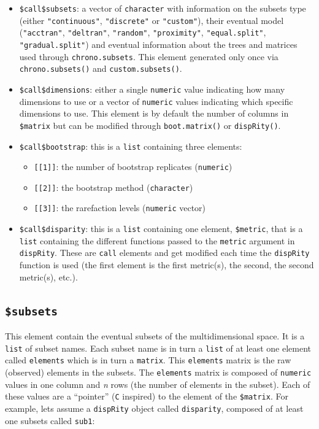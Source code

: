 \documentclass[]{book}
\providecommand{\tightlist}{%
  \setlength{\itemsep}{0pt}\setlength{\parskip}{0pt}}
\begin{document}
\begin{itemize}
\tightlist
\item
  \texttt{\$call\$subsets}: a vector of \texttt{character} with information on the subsets type (either \texttt{"continuous"}, \texttt{"discrete"} or \texttt{"custom"}), their eventual model (\texttt{"acctran"}, \texttt{"deltran"}, \texttt{"random"}, \texttt{"proximity"}, \texttt{"equal.split"}, \texttt{"gradual.split"}) and eventual information about the trees and matrices used through \texttt{chrono.subsets}. This element generated only once via \texttt{chrono.subsets()} and \texttt{custom.subsets()}.
\item
  \texttt{\$call\$dimensions}: either a single \texttt{numeric} value indicating how many dimensions to use or a vector of \texttt{numeric} values indicating which specific dimensions to use. This element is by default the number of columns in \texttt{\$matrix} but can be modified through \texttt{boot.matrix()} or \texttt{dispRity()}.
\item
  \texttt{\$call\$bootstrap}: this is a \texttt{list} containing three elements:

  \begin{itemize}
  \tightlist
  \item
    \texttt{{[}{[}1{]}{]}}: the number of bootstrap replicates (\texttt{numeric})
  \item
    \texttt{{[}{[}2{]}{]}}: the bootstrap method (\texttt{character})
  \item
    \texttt{{[}{[}3{]}{]}}: the rarefaction levels (\texttt{numeric} vector)
  \end{itemize}
\item
  \texttt{\$call\$disparity}: this is a \texttt{list} containing one element, \texttt{\$metric}, that is a \texttt{list} containing the different functions passed to the \texttt{metric} argument in \texttt{dispRity}. These are \texttt{call} elements and get modified each time the \texttt{dispRity} function is used (the first element is the first metric(s), the second, the second metric(s), etc.).
\end{itemize}

\hypertarget{subsets}{%
\subsection{\texorpdfstring{\texttt{\$subsets}}{\$subsets}}\label{subsets}}

This element contain the eventual subsets of the multidimensional space.
It is a \texttt{list} of subset names.
Each subset name is in turn a \texttt{list} of at least one element called \texttt{elements} which is in turn a \texttt{matrix}.
This \texttt{elements} matrix is the raw (observed) elements in the subsets.
The \texttt{elements} matrix is composed of \texttt{numeric} values in one column and \emph{n} rows (the number of elements in the subset).
Each of these values are a ``pointer'' (\texttt{C} inspired) to the element of the \texttt{\$matrix}.
For example, lets assume a \texttt{dispRity} object called \texttt{disparity}, composed of at least one subsets called \texttt{sub1}:
\end{document}
